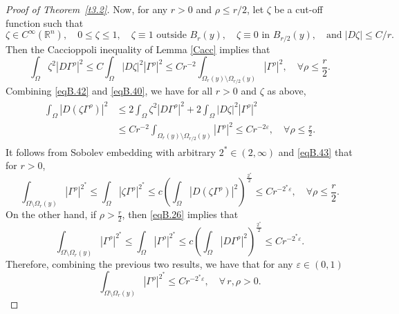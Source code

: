 \documentclass[12pt,reqno]{amsart}
\theoremstyle{plain}
\theoremstyle{definition}
\newenvironment{pf}
{\begin{proof}} {\end{proof}}
\newcommand{\eps}{\varepsilon}
\newcommand{\Ga}{\Gamma}
\newcommand{\Om}{\Omega}
\newcommand{\iny}{\infty}
\newcommand{\abs}[1]{\left\vert#1\right\vert}
\newcommand{\pr}[1]{\left( #1 \right) }
\newcommand{\R}{\ensuremath{\mathbb{R}}}
\begin{document}
\begin{appendix}
\begin{pf}[Proof of Theorem~\ref{t3.2}]
Now, for any  $r > 0$ and $\rho\le r/{2}$, let $\zeta$ be a cut-off function such that
\begin{equation}
\label{eqB.41}
\zeta \in C^{\iny}(\R^n), \quad
0\le \zeta \le 1, \quad 
\zeta \equiv 1 \text{ outside $B_{r}(y)$}, \quad 
\zeta \equiv 0 \text{ in $B_{r/2}(y)$}, \quad 
\text{and} \;  \abs{D \zeta} \le C/r.
\end{equation}
Then the Caccioppoli inequality of Lemma \ref{Cacc} implies that
\begin{equation}
\label{eqB.42}
\int_{\Om} \zeta^2 \abs{D\Ga^\rho}^2 
\le C \int_{\Om} \abs{D\zeta}^2 \abs{\Ga^\rho}^2 
\le C r^{-2} \int_{\Om_{r}(y)\setminus \Om_{r/2}(y)} \abs{\Ga^\rho}^2, \quad \forall \rho \le \frac{r}{2}.
\end{equation}
%
Combining \eqref{eqB.42} and \eqref{eqB.40}, we have for all $r > 0$ and $\zeta$ as above,
\begin{align}
\label{eqB.43}
\begin{split}
\int_{\Om} \abs{D(\zeta \Ga^\rho)}^2 
&\le 2 \int_{\Om} \zeta^2 \abs{D\Ga^\rho}^2 + 2 \int_{\Om} \abs{D\zeta}^2 \abs{\Ga^\rho}^2 \\
&\le C r^{-2} \int_{\Om_{r}(y)\setminus \Om_{r/2}(y)} \abs{\Ga^\rho}^2 
\le C r^{-2\eps}
, \quad \forall \rho\le \frac{r}{2}.
\end{split}
\end{align}
It follows from Sobolev embedding with arbitrary $2^* \in \pr{2, \iny}$ and \eqref{eqB.43} that for $r > 0$,
\begin{equation*}
\int_{\Omega \setminus \Om_r(y)} \abs{\Ga^\rho}^{2^*} 
\le \int_{\Omega} \abs{\zeta \Ga^\rho}^{2^*} 
\le c \pr{\int_{\Omega} \abs{D\pr{\zeta \Ga^\rho}}^2}^{\frac{2^*}{2}} 
\le C r^{-2^*\eps}
, \quad \forall \rho \le \frac{r}{2}.
\end{equation*}
On the other hand, if $\rho > \frac r 2$, then \eqref{eqB.26} implies that
\begin{equation*}
\int_{\Om \setminus \Om_r(y)} \abs{\Ga^\rho}^{2^*} 
\le \int_{\Om} \abs{\Ga^\rho}^{2^*} 
\le c \pr{ \int_{\Om} \abs{D\Ga^\rho}^2 }^{\frac{2^*}{2}} 
\le C r^{-2^*\eps}.
\end{equation*}
Therefore, combining the previous two results, we have that for any $\eps \in \pr{0, 1}$
\begin{equation}
\label{eqB.44}
\int_{\Om\setminus \Om_r(y)} |\Ga^\rho|^{2^*} 
\le C r^{-2^*\eps}, \quad \forall \, r, \rho > 0.
\end{equation}


\end{pf}
\end{appendix}
\end{document}
